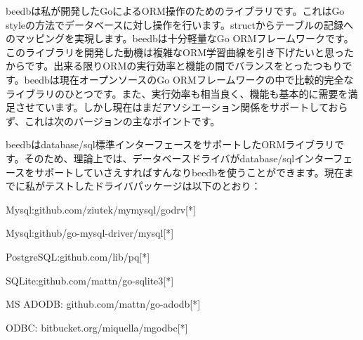 beedbは私が開発したGoによるORM操作のためのライブラリです。これはGo styleの方法でデータベースに対し操作を行います。structからテーブルの記録へのマッピングを実現します。beedbは十分軽量なGo ORMフレームワークです。このライブラリを開発した動機は複雑なORM学習曲線を引き下げたいと思ったからです。出来る限りORMの実行効率と機能の間でバランスをとったつもりです。beedbは現在オープンソースのGo ORMフレームワークの中で比較的完全なライブラリのひとつです。また、実行効率も相当良く、機能も基本的に需要を満足させています。しかし現在はまだアソシエーション関係をサポートしておらず、これは次のバージョンの主なポイントです。

beedbはdatabase/sql標準インターフェースをサポートしたORMライブラリです。そのため、理論上では、データベースドライバがdatabase/sqlインターフェースをサポートしていさえすればすんなりbeedbを使うことができます。現在までに私がテストしたドライバパッケージは以下のとおり：

\begin{description}
  \item Mysql:github.com/ziutek/mymysql/godrv[*]
  \item Mysql:github/go-mysql-driver/mysql[*]
  \item PostgreSQL:github.com/lib/pq[*]
  \item SQLite:github.com/mattn/go-sqlite3[*]
  \item MS ADODB: github.com/mattn/go-adodb[*]
  \item ODBC: bitbucket.org/miquella/mgodbc[*]
\end{description}
